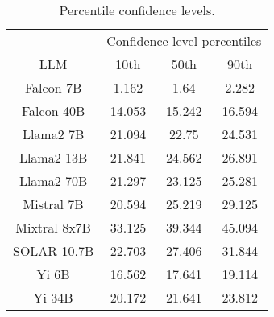 \begin{table*}
\centering
\begin{tabular}{c|c|c|c}
& \multicolumn{3}{c}{Confidence level percentiles} \\ 
LLM & 10th & 50th & 90th\\ \hline
Falcon 7B & 1.162 & 1.64 & 2.282\\
Falcon 40B & 14.053 & 15.242 & 16.594\\
Llama2 7B & 21.094 & 22.75 & 24.531\\
Llama2 13B & 21.841 & 24.562 & 26.891\\
Llama2 70B & 21.297 & 23.125 & 25.281\\
Mistral 7B & 20.594 & 25.219 & 29.125\\
Mixtral 8x7B & 33.125 & 39.344 & 45.094\\
SOLAR 10.7B & 22.703 & 27.406 & 31.844\\
Yi 6B & 16.562 & 17.641 & 19.114\\
Yi 34B & 20.172 & 21.641 & 23.812\\
\hline
\end{tabular}
\caption{Percentile confidence levels.}
\label{tab:percentile_conf}
\end{table*}
